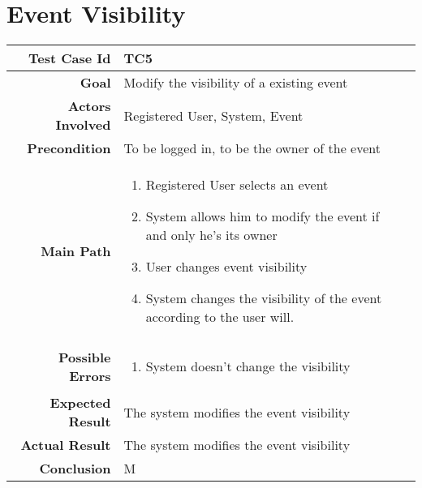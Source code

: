 \section{Event Visibility}
\begin{tabularx}{\linewidth}{|r|X|X|}
\hline   {\bf Test Case Id} &  TC5\\
  \hline  {\bf Goal} & Modify the visibility of a existing event\\
  \hline  {\bf Actors Involved} & Registered User, System, Event\\
  \hline  {\bf Precondition} & To be logged in, to be the owner of the event\\ 
   \hline  {\bf Main Path} & \begin{enumerate} 
   \item Registered User selects an event
   \item System allows him to modify the event if and only he's its owner
   \item User changes event visibility
    \item System changes the visibility of the event according to the user will.
   \end{enumerate}\\
   \hline  {\bf Possible Errors} & \begin{enumerate} 
   \item System doesn't change the visibility
   \end{enumerate}\\
  \hline  {\bf Expected Result} & The system modifies the event visibility\\
  \hline  {\bf Actual Result} & The system modifies the event visibility\\
  \hline  {\bf Conclusion} & M\\
  \hline
  
\end{tabularx}

